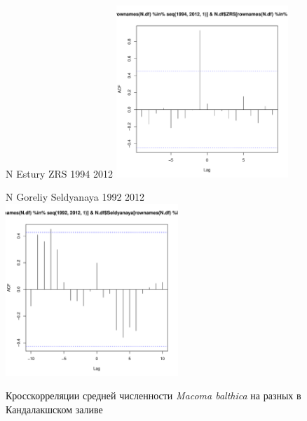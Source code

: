 \documentclass[12pt, a4paper]{disser}
\begin{document}
\begin{figure}[ht]
	\begin{minipage}[b]{.46\linewidth}
	\begin{center}
	{\tiny N Estury ZRS 1994 2012}
	\includegraphics[width=65mm]{../White_Sea/dynamic_N_N1/crosscorr_N_Estury_ZRS_1994_2012.pdf}
	\end{center}
	\end{minipage}
%
	\hfil %
%
	\begin{minipage}[b]{.46\linewidth}
	\begin{center}
	{\tiny N Goreliy Seldyanaya 1992 2012}
	\includegraphics[width=65mm]{../White_Sea/dynamic_N_N1/crosscorr_N_Goreliy_Seldyanaya_1992_2012.pdf}
	\end{center}
	\end{minipage}

	\caption{Кросскорреляции средней численности {\it Macoma balthica} на разных в Кандалакшском заливе}
	\label{ris:сcrosscorr_N_Kandalaksha}
	\end{figure}
\end{document}
